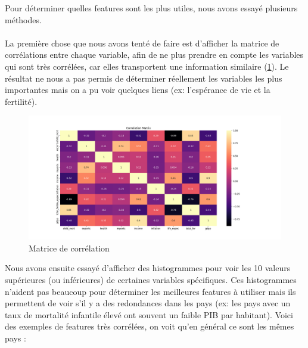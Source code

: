 \documentclass{article}
\begin{document}
\noindent Pour déterminer quelles features sont les plus utiles, nous avons essayé plusieurs méthodes. \\ \\
La première chose que nous avons tenté de faire est d'afficher la matrice de corrélations entre chaque variable, afin de ne plus prendre en compte les variables qui sont très corrélées, car elles transportent une information similaire (\ref{fig:corr_matrix}). Le résultat ne nous a pas permis de déterminer réellement les variables les plus importantes mais on a pu voir quelques liens (ex: l'espérance de vie et la fertilité).

\begin{figure}[H]
    \centering
    \includegraphics[width=\linewidth]{plot/corr_matrix.png}
    \caption{Matrice de corrélation}
    \label{fig:corr_matrix}
\end{figure}

\noindent Nous avons ensuite essayé d'afficher des histogrammes pour voir les 10 valeurs supérieures (ou inférieures) de certaines variables spécifiques. Ces histogrammes n'aident pas beaucoup pour déterminer les meilleures features à utiliser mais ils permettent de voir s'il y a des redondances dans les pays (ex: les pays avec un taux de mortalité infantile élevé ont souvent un faible PIB par habitant). Voici des exemples de features très corrélées, on voit qu’en général ce sont les mêmes pays :
\end{document}
